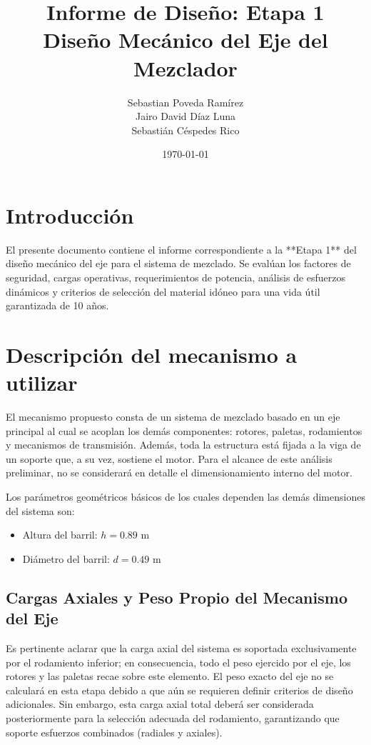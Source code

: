 \documentclass[12pt, a4paper]{article}
\title{\textbf{Informe de Diseño: Etapa 1}\\ \large Diseño Mecánico del Eje del Mezclador}
\author{Sebastian Poveda Ramírez \\ Jairo David Díaz Luna \\ Sebastián Céspedes Rico}
\date{\today}
\begin{document}
\maketitle
\thispagestyle{empty} 
\newpage

\tableofcontents
\newpage



\section{Introducción}
El presente documento contiene el informe correspondiente a la **Etapa 1** del diseño mecánico del eje para el sistema de mezclado. Se evalúan los factores de seguridad, cargas operativas, requerimientos de potencia, análisis de esfuerzos dinámicos y criterios de selección del material idóneo para una vida útil garantizada de 10 años.

\section{Descripción del mecanismo a utilizar}
El mecanismo propuesto consta de un sistema de mezclado basado en un eje principal al cual se acoplan los demás componentes: rotores, paletas, rodamientos y mecanismos de transmisión. Además, toda la estructura está fijada a la viga de un soporte que, a su vez, sostiene el motor. Para el alcance de este análisis preliminar, no se considerará en detalle el dimensionamiento interno del motor. 

Los parámetros geométricos básicos de los cuales dependen las demás dimensiones del sistema son: 

\begin{itemize}
    \item Altura del barril: $h = 0.89 \text{ m}$
    \item Diámetro del barril: $d = 0.49 \text{ m}$
\end{itemize}

\subsection{Cargas Axiales y Peso Propio del Mecanismo del Eje}
Es pertinente aclarar que la carga axial del sistema es soportada exclusivamente por el rodamiento inferior; en consecuencia, todo el peso ejercido por el eje, los rotores y las paletas recae sobre este elemento. El peso exacto del eje no se calculará en esta etapa debido a que aún se requieren definir criterios de diseño adicionales. Sin embargo, esta carga axial total deberá ser considerada posteriormente para la selección adecuada del rodamiento, garantizando que soporte esfuerzos combinados (radiales y axiales).
\end{document}
